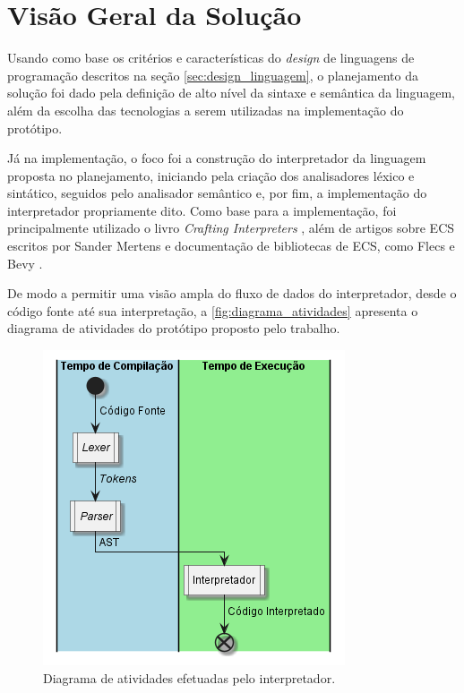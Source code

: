 \section{Visão Geral da Solução}

Usando como base os critérios e características do \textit{design} de linguagens de programação descritos na seção \ref{sec:design_linguagem}, o planejamento da solução foi dado pela definição de alto nível da sintaxe e semântica da linguagem, além da escolha das tecnologias a serem utilizadas na implementação do protótipo.

Já na implementação, o foco foi a construção do interpretador da linguagem proposta no planejamento, iniciando pela criação dos analisadores léxico e sintático, seguidos pelo analisador semântico e, por fim, a implementação do interpretador propriamente dito. Como base para a implementação, foi principalmente utilizado o livro \textit{Crafting Interpreters} \cite{craftinginterpreters}, além de artigos sobre ECS escritos por Sander Mertens e documentação de bibliotecas de ECS, como Flecs \cite{flecs} e Bevy \cite{bevy}.


De modo a permitir uma visão ampla do fluxo de dados do interpretador, desde o código fonte até sua interpretação, a \autoref{fig:diagrama_atividades} apresenta o diagrama de atividades do protótipo proposto pelo trabalho.

\begin{figure}[H]
	\centering
	\includegraphics[width=0.25\textheight]{../diagrams/diagrama_atividades.png}
	\caption{Diagrama de atividades efetuadas pelo interpretador.}
	\label{fig:diagrama_atividades}
\end{figure}

